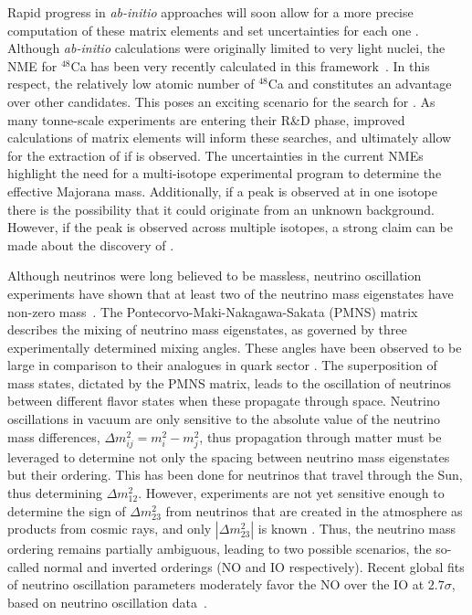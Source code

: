 Rapid progress in \textit{ab-initio} approaches will soon allow for a more precise computation of these matrix elements and set uncertainties for each one \cite{Engel_2017}. Although \textit{ab-initio} calculations were originally limited to very light nuclei, the NME for $^{48}$Ca has been very recently calculated in this framework~\cite{ca48}. In this respect, the relatively low atomic number of $^{48}$Ca and \geEn{} constitutes an advantage over other \novbb{} candidates. This poses an exciting scenario for the search for \novbb{}. As many tonne-scale experiments are entering their R\&D phase, improved calculations of matrix elements will inform these searches, and ultimately allow for the extraction of \mbb{} if \novbb{} is observed. The uncertainties in the current NMEs highlight the need for a multi-isotope \novbb{} experimental program to determine the effective Majorana mass. Additionally, if a peak is observed at \Qbb{} in one isotope there is the possibility that it could originate from an unknown background. However, if the \Qbb{} peak is observed across multiple isotopes, a strong claim can be made about the discovery of \novbb{}. 

Although neutrinos were long believed to be massless, neutrino oscillation experiments have shown that at least two of the neutrino mass eigenstates have non-zero mass~\cite{osc_sol,osc_atm}. The Pontecorvo-Maki-Nakagawa-Sakata (PMNS) matrix describes the mixing of neutrino mass eigenstates, as governed by three experimentally determined mixing angles. These angles have been observed to be large in comparison to their analogues in quark sector \cite{pdg_revparticlephys}. The superposition of mass states, dictated by the PMNS matrix, leads to the oscillation of neutrinos between different flavor states when these propagate through space. Neutrino oscillations in vacuum are only sensitive to the absolute value of the neutrino mass differences, $\Delta m^2_{ij} = m^2_i - m^2_j$, thus propagation through matter must be leveraged to determine not only the spacing between neutrino mass eigenstates but their ordering. This has been done for neutrinos that travel through the Sun, thus determining $\Delta m^2_{12}$. However, experiments are not yet sensitive enough to determine the sign of $\Delta m^2_{23}$ from neutrinos that are created in the atmosphere as products from cosmic rays, and only $|\Delta m^2_{23}|$ is known \cite{osc_rev}. Thus, the neutrino mass ordering remains partially ambiguous, leading to two possible scenarios, the so-called normal and inverted orderings (NO and IO respectively). Recent global fits of neutrino oscillation parameters moderately favor the NO over the IO at $2.7\sigma$, based on neutrino oscillation data~\cite{NH}. 

